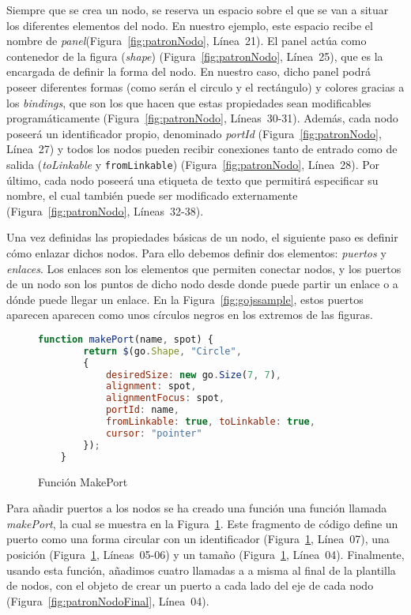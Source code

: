 Siempre que se crea un nodo, se reserva un espacio sobre el que se van a situar los diferentes elementos del nodo. En nuestro ejemplo, este espacio recibe el nombre de \emph{panel}(Figura~\ref{fig:patronNodo}, Línea~21). El panel actúa como contenedor de la figura (\emph{shape}) (Figura~\ref{fig:patronNodo}, Línea~25), que es la encargada de definir la forma del nodo. En nuestro caso, dicho panel podrá poseer diferentes formas (como serán el circulo y el rectángulo) y colores gracias a los \emph{bindings}, que son los que hacen que estas propiedades sean modificables programáticamente (Figura~\ref{fig:patronNodo}, Líneas~30-31). Además, cada nodo poseerá un identificador propio, denominado \emph{portId} (Figura~\ref{fig:patronNodo}, Línea~27) y todos los nodos pueden recibir conexiones tanto de entrado como de salida (\emph{toLinkable} y \texttt{fromLinkable}) (Figura~\ref{fig:patronNodo}, Línea~28). Por último, cada nodo poseerá una etiqueta de texto que permitirá especificar su nombre, el cual también puede ser modificado externamente (Figura~\ref{fig:patronNodo}, Líneas~32-38).

Una vez definidas las propiedades básicas de un nodo, el siguiente paso es definir cómo enlazar dichos nodos. Para ello debemos definir dos elementos: \emph{puertos} y \emph{enlaces}. Los enlaces son los elementos que permiten conectar nodos, y los puertos de un nodo son los puntos de dicho nodo desde donde puede partir un enlace o a dónde puede llegar un enlace.  En la Figura~\ref{fig:gojssample}, estos puertos aparecen aparecen como unos círculos negros en los extremos de las figuras.

\begin{figure}[!tb]
	\centering
	\begin{lstlisting}[language=JavaScript]
	function makePort(name, spot) {
		return $(go.Shape, "Circle",
		{
			desiredSize: new go.Size(7, 7),
			alignment: spot,
			alignmentFocus: spot,
			portId: name,
			fromLinkable: true, toLinkable: true,
			cursor: "pointer"
		});
	}\end{lstlisting}
	\caption{Función MakePort}
	\label{fig:funcionMakeport}
\end{figure}
	
Para añadir puertos a los nodos se ha creado una función una función llamada \emph{makePort}, la cual se muestra en la Figura~\ref{fig:funcionMakeport}. Este fragmento de código define un puerto como una forma circular con un identificador (Figura~\ref{fig:funcionMakeport}, Línea~07), una posición (Figura~\ref{fig:funcionMakeport}, Líneas~05-06) y un tamaño (Figura~\ref{fig:funcionMakeport}, Línea~04). Finalmente, usando esta función, añadimos cuatro llamadas a a misma al final de la plantilla de nodos, con el objeto de crear un puerto a cada lado del eje de cada nodo (Figura~\ref{fig:patronNodoFinal}, Línea~04).

